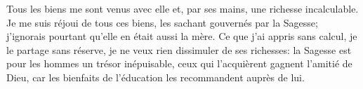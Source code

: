 Tous les biens me sont venus avec elle et, par ses mains, une richesse incalculable.
Je me suis réjoui de tous ces biens, les sachant gouvernés par la Sagesse;
	j’ignorais pourtant qu’elle en était aussi la mère.
Ce que j’ai appris sans calcul, je le partage sans réserve,
	je ne veux rien dissimuler de ses richesses:
	la Sagesse est pour les hommes un trésor inépuisable,
	ceux qui l’acquièrent gagnent l’amitié de Dieu,
	car les bienfaits de l’éducation les recommandent auprès de lui.
